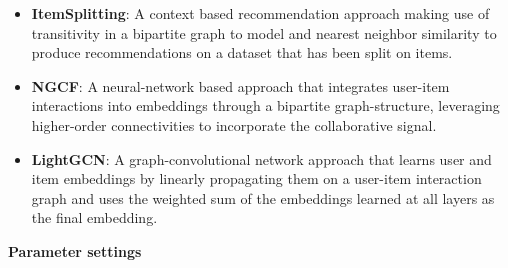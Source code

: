 \begin{itemize}
    \item \textbf{ItemSplitting\cite{GraphBasedCollaborativePaper}}: A context based recommendation approach making use of transitivity in a bipartite graph to model and nearest neighbor similarity to produce recommendations on a dataset that has been split on items.
    \item \textbf{NGCF\cite{NGCF}}: A neural-network based approach that integrates user-item interactions into embeddings through a bipartite graph-structure, leveraging higher-order connectivities to incorporate the collaborative signal.
    \item \textbf{LightGCN\cite{LightGCN}}: A graph-convolutional network approach that learns user and item embeddings by linearly propagating them on a user-item interaction graph and uses the weighted sum of the embeddings learned at all layers as the final embedding.
\end{itemize}
\textbf{Parameter settings}\\
